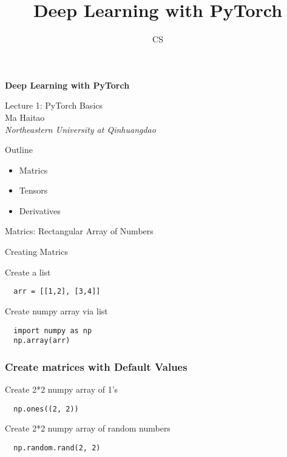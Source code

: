 \documentclass[14 pt]{beamer}
\author[mht]{CS}
\title[Deep Learning with PyTorch]{Deep Learning with PyTorch}
\institute{Northeastern University at Qinhuangdao}
\let\olditem\item
\renewcommand{\item}{\olditem\vspace{4pt}}
\newcommand{\comment}[1]{\textcolor{comment}{\footnotesize{#1}\normalsize}} %
\newcommand{\Comment}[1]{\textcolor{Comment}{\footnotesize{#1}\normalsize}} %
\newcommand{\COMMENT}[1]{\textcolor{COMMENT}{\footnotesize{#1}\normalsize}} %
\begin{document}
\begin{frame}[c]
\begin{center}
	\textcolor{normal text.fg!50!Comment}{\textbf{\Large{Deep Learning with PyTorch}}}
	\vspace{4em}

    \COMMENT{\large{Lecture 1: PyTorch Basics}} \\
\vspace{4em}
    \Comment{{Ma Haitao}} \\
\comment{\textit{Northeastern University at Qinhuangdao}}\\
\end{center}
\end{frame}

\begin{frame}{Outline}
  \begin{itemize}
  \item Matrics
  \item Tensors
  \item Derivatives
\end{itemize}
\end{frame}

\begin{frame}
\begin{center}
\Large{Matrics: Rectangular Array of Numbers}
\end{center}
\end{frame}

\begin{frame}[fragile]{Creating Matrics}
  \begin{block}{Create a list}
\begin{verbatim}
  arr = [[1,2], [3,4]] 
\end{verbatim}
  \end{block}
  \begin{block}{Create numpy array via list}
\begin{verbatim}
  import numpy as np
  np.array(arr) 
\end{verbatim}
  \end{block}
\end{frame}

\begin{frame}[fragile]
  \frametitle{Create matrices with Default Values}
  \begin{block}{Create 2*2 numpy array of 1's}
\begin{verbatim}
  np.ones((2, 2))
\end{verbatim}
  \end{block}
  \begin{block}{Create 2*2 numpy array of random numbers}
\begin{verbatim}
  np.random.rand(2, 2)
\end{verbatim}
  \end{block}
\end{frame}
\end{document}
